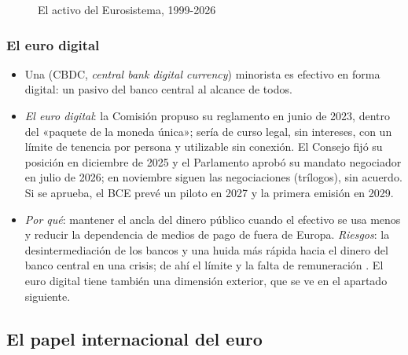 \documentclass[11pt]{article}
\begin{document}
\begin{figure}[H]
\centering
\caption{El activo del Eurosistema, 1999-2026}\label{fig:balance}
\end{figure}

\subsubsection{El euro digital}\label{sec:euro-digital}

\begin{itemize}
\item Una  (CBDC, \emph{central bank digital currency}) minorista es efectivo en forma digital: un pasivo del banco central al alcance de todos.
\item \emph{El euro digital}: la Comisión propuso su reglamento en junio de 2023, dentro del «paquete de la moneda única»\nocite{Comision2023EuroDigital}; sería de curso legal, sin intereses, con un límite de tenencia por persona y utilizable sin conexión. El Consejo fijó su posición en diciembre de 2025 y el Parlamento aprobó su mandato negociador en julio de 2026; en noviembre siguen las negociaciones (trílogos), sin acuerdo\nocite{Consejo2025EuroDigital,PE2026EuroDigital}. Si se aprueba, el BCE prevé un piloto en 2027 y la primera emisión en 2029\nocite{BCE2025EuroDigital}.
\item \emph{Por qué}: mantener el ancla del dinero público cuando el efectivo se usa menos y reducir la dependencia de medios de pago de fuera de Europa. \emph{Riesgos}: la desintermediación de los bancos y una huida más rápida hacia el dinero del banco central en una crisis; de ahí el límite y la falta de remuneración . El euro digital tiene también una dimensión exterior, que se ve en el apartado siguiente.
\end{itemize}

\subsection{El papel internacional del euro}\label{sec:internacional}
\end{document}
